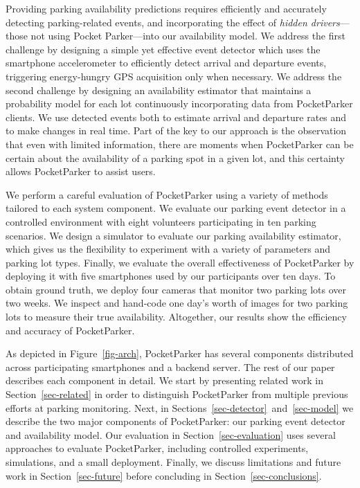 Providing parking availability predictions requires efficiently and
accurately detecting parking-related events, and incorporating the effect of
\textit{hidden drivers}---those not using Pocket Parker---into our
availability model. We address the first challenge by designing a simple yet
effective event detector which uses the smartphone accelerometer to
efficiently detect arrival and departure events, triggering energy-hungry GPS
acquisition only when necessary. We address the second challenge by designing
an availability estimator that maintains a probability model for each lot
continuously incorporating data from PocketParker clients. We use detected
events both to estimate arrival and departure rates and to make changes in
real time. Part of the key to our approach is the observation that even with
limited information, there are moments when PocketParker can be certain about
the availability of a parking spot in a given lot, and this certainty allows
PocketParker to assist users.

We perform a careful evaluation of PocketParker using a variety of methods
tailored to each system component. We evaluate our parking event detector in
a controlled environment with eight volunteers participating in ten parking
scenarios. We design a simulator to evaluate our parking availability
estimator, which gives us the flexibility to experiment with a variety of
parameters and parking lot types. Finally, we evaluate the overall
effectiveness of PocketParker by deploying it with five smartphones used by
our participants over ten days. To obtain ground truth, we deploy four
cameras that monitor two parking lots over two weeks. We inspect and
hand-code one day's worth of images for two parking lots to measure their
true availability. Altogether, our results show the efficiency and accuracy
of PocketParker.

As depicted in Figure~\ref{fig-arch}, PocketParker has several components
distributed across participating smartphones and a backend server. The rest
of our paper describes each component in detail. We start by presenting
related work in Section~\ref{sec-related} in order to distinguish
PocketParker from multiple previous efforts at parking monitoring. Next, in
Sections~\ref{sec-detector}~and~\ref{sec-model} we describe the two major
components of PocketParker: our parking event detector and availability
model. Our evaluation in Section~\ref{sec-evaluation} uses several approaches
to evaluate PocketParker, including controlled experiments, simulations, and
a small deployment. Finally, we discuss limitations and future work in
Section~\ref{sec-future} before concluding in Section~\ref{sec-conclusions}.

